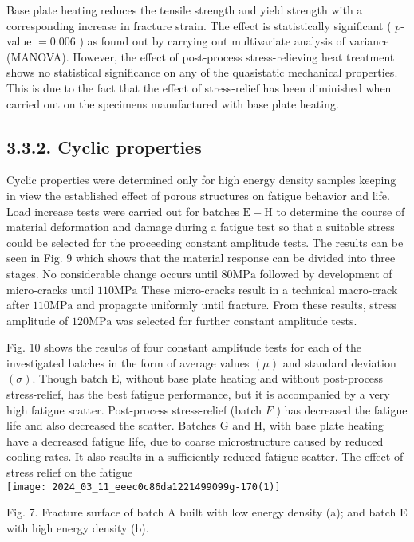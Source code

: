 \documentclass[10pt]{article}
\begin{document}
Base plate heating reduces the tensile strength and yield strength with a corresponding increase in fracture strain. The effect is statistically significant ( $p$-value $=0.006$ ) as found out by carrying out multivariate analysis of variance (MANOVA). However, the effect of post-process stress-relieving heat treatment shows no statistical significance on any of the quasistatic mechanical properties. This is due to the fact that the effect of stress-relief has been diminished when carried out on the specimens manufactured with base plate heating.

\subsection*{3.3.2. Cyclic properties}
Cyclic properties were determined only for high energy density samples keeping in view the established effect of porous structures on fatigue behavior and life. Load increase tests were carried out for batches $\mathrm{E}-\mathrm{H}$ to determine the course of material deformation and damage during a fatigue test so that a suitable stress could be selected for the proceeding constant amplitude tests. The results can be seen in Fig. 9 which shows that the material response can be divided into three stages. No considerable change occurs until $80 \mathrm{MPa}$ followed by development of micro-cracks until $110 \mathrm{MPa}$ These micro-cracks result in a technical macro-crack after $110 \mathrm{MPa}$ and propagate uniformly until fracture. From these results, stress amplitude of $120 \mathrm{MPa}$ was selected for further constant amplitude tests.

Fig. 10 shows the results of four constant amplitude tests for each of the investigated batches in the form of average values $(\mu)$ and standard deviation $(\sigma)$. Though batch $\mathrm{E}$, without base plate heating and without post-process stress-relief, has the best fatigue performance, but it is accompanied by a very high fatigue scatter. Post-process stress-relief (batch $F$ ) has decreased the fatigue life and also decreased the scatter. Batches $\mathrm{G}$ and $\mathrm{H}$, with base plate heating have a decreased fatigue life, due to coarse microstructure caused by reduced cooling rates. It also results in a sufficiently reduced fatigue scatter. The effect of stress relief on the fatigue\\
\texttt{[image: 2024\_03\_11\_eeec0c86da1221499099g-170(1)]}

Fig. 7. Fracture surface of batch A built with low energy density (a); and batch E with high energy density (b).
\end{document}
